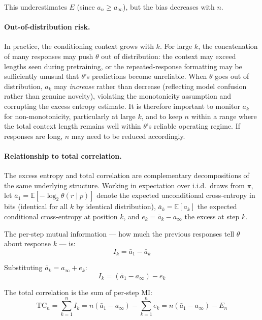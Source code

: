 \documentclass[11pt]{article}
\newcommand{\E}{\mathbb{E}}
\newcommand{\TC}{\mathrm{TC}}
\begin{document}
This underestimates $E$ (since $a_n \geq a_\infty$), but the bias decreases with $n$.

\paragraph{Out-of-distribution risk.} In practice, the conditioning context grows with $k$. For large $k$, the concatenation of many responses may push $\theta$ out of distribution: the context may exceed lengths seen during pretraining, or the repeated-response formatting may be sufficiently unusual that $\theta$'s predictions become unreliable. When $\theta$ goes out of distribution, $a_k$ may \emph{increase} rather than decrease (reflecting model confusion rather than genuine novelty), violating the monotonicity assumption and corrupting the excess entropy estimate. It is therefore important to monitor $a_k$ for non-monotonicity, particularly at large $k$, and to keep $n$ within a range where the total context length remains well within $\theta$'s reliable operating regime. If responses are long, $n$ may need to be reduced accordingly.

\paragraph{Relationship to total correlation.} The excess entropy and total correlation are complementary decompositions of the same underlying structure. Working in expectation over i.i.d.\ draws from $\pi$, let $\bar{a}_1 = \E[-\log_2 \theta(r \mid p)]$ denote the expected unconditional cross-entropy in bits (identical for all $k$ by identical distribution), $\bar{a}_k = \E[a_k]$ the expected conditional cross-entropy at position $k$, and $e_k = \bar{a}_k - a_\infty$ the excess at step $k$.

The per-step mutual information --- how much the previous responses tell $\theta$ about response $k$ --- is:
\begin{equation}
    I_k = \bar{a}_1 - \bar{a}_k
\end{equation}

Substituting $\bar{a}_k = a_\infty + e_k$:
\begin{equation}
    I_k = (\bar{a}_1 - a_\infty) - e_k
\end{equation}

The total correlation is the sum of per-step MI:
\begin{equation}
    \TC_n = \sum_{k=1}^{n} I_k = n(\bar{a}_1 - a_\infty) - \sum_{k=1}^{n} e_k = n(\bar{a}_1 - a_\infty) - E_n
\end{equation}
\end{document}
